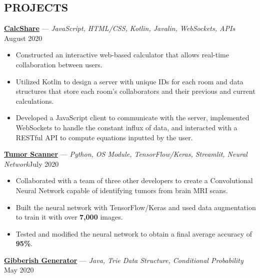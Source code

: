 \documentclass[11pt]{res}
\begin{document}
\begin{footnotesize}
\begin{resume}
\begin{small}
\section{PROJECTS}
\end{small} 
\vspace{.5mm}
\href{https://github.com/CharlesShi12/CalcShare}{\textbf{CalcShare}} — {\sl JavaScript, HTML/CSS, Kotlin, Javalin, WebSockets, APIs} \hfill August 2020\vspace{-5mm}
\begin{itemize}[leftmargin=6.25mm] \itemsep -2pt 
\item Constructed an interactive web-based calculator that allows real-time collaboration between users. 
\vspace{1mm}
\item Utilized Kotlin to design a server with unique IDs for each room and data structures that store each room's collaborators and their previous and current calculations.
\vspace{1mm}
\item Developed a JavaScript client to communicate with the server, implemented WebSockets to handle the constant influx of data, and interacted with a RESTful API to compute equations inputted by the user. 
\end{itemize}
\vspace{-2.5mm}
\href{https://github.com/CharlesShi12/AI_Tumor_Scanner}{\textbf{Tumor Scanner}} — {\sl Python, OS Module, TensorFlow/Keras, Streamlit, Neural Network}\hfill July 2020\vspace{-5mm}
\begin{itemize}[leftmargin=6.25mm] \itemsep -2pt 
\item Collaborated with a team of three other developers to create a Convolutional Neural Network capable of identifying tumors from brain MRI scans.
\vspace{1mm}
\item Built the neural network with TensorFlow/Keras and used data augmentation to train it with over \textbf{7,000} images.
\vspace{1mm}
\item Tested and modified the neural network to obtain a final average accuracy of \textbf{95\%}. 
\end{itemize}
\vspace{-2.5mm}
\href{https://github.com/CharlesShi12/GibberishGenerator}{\textbf{Gibberish Generator}} — {\sl Java, Trie Data Structure, Conditional Probability} \hfill May 2020\vspace{-5mm}

\end{resume}
\end{footnotesize}
\end{document}
